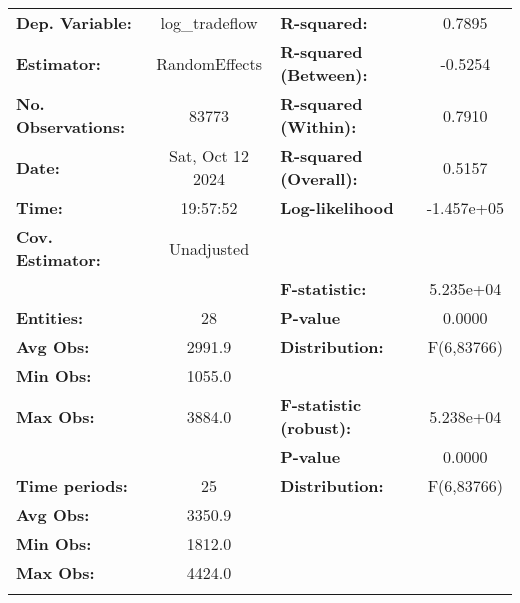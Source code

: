 \documentclass{article}
\begin{document}
\begin{center}
\begin{tabular}{lclc}
\toprule
\textbf{Dep. Variable:}    &   log\_tradeflow   & \textbf{  R-squared:         }   &      0.7895      \\
\textbf{Estimator:}        &   RandomEffects    & \textbf{  R-squared (Between):}  &     -0.5254      \\
\textbf{No. Observations:} &       83773        & \textbf{  R-squared (Within):}   &      0.7910      \\
\textbf{Date:}             &  Sat, Oct 12 2024  & \textbf{  R-squared (Overall):}  &      0.5157      \\
\textbf{Time:}             &      19:57:52      & \textbf{  Log-likelihood     }   &    -1.457e+05    \\
\textbf{Cov. Estimator:}   &     Unadjusted     & \textbf{                     }   &                  \\
\textbf{}                  &                    & \textbf{  F-statistic:       }   &    5.235e+04     \\
\textbf{Entities:}         &         28         & \textbf{  P-value            }   &      0.0000      \\
\textbf{Avg Obs:}          &       2991.9       & \textbf{  Distribution:      }   &    F(6,83766)    \\
\textbf{Min Obs:}          &       1055.0       & \textbf{                     }   &                  \\
\textbf{Max Obs:}          &       3884.0       & \textbf{  F-statistic (robust):} &    5.238e+04     \\
\textbf{}                  &                    & \textbf{  P-value            }   &      0.0000      \\
\textbf{Time periods:}     &         25         & \textbf{  Distribution:      }   &    F(6,83766)    \\
\textbf{Avg Obs:}          &       3350.9       & \textbf{                     }   &                  \\
\textbf{Min Obs:}          &       1812.0       & \textbf{                     }   &                  \\
\textbf{Max Obs:}          &       4424.0       & \textbf{                     }   &                  \\
\textbf{}                  &                    & \textbf{                     }   &                  \\
\bottomrule

\end{tabular}
\end{center}
\end{document}
